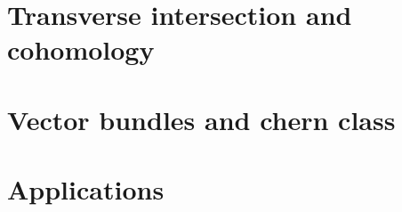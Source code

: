 \documentclass{article}
\begin{document}
\newpage
\section{Transverse intersection and cohomology}

\newpage
\section{Vector bundles and chern class}

\newpage
\section{Applications}
\end{document}
